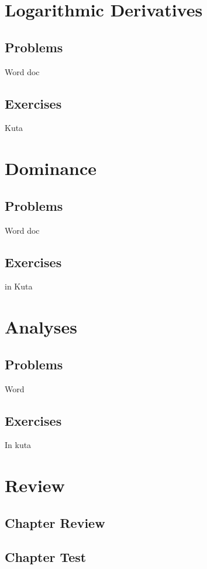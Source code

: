 \newpage
\section{Logarithmic Derivatives}
\subsection{Problems}
Word doc
\newpage

\newpage
\subsection{Exercises}
Kuta


\newpage
\section{Dominance}
\subsection{Problems}
Word doc
\newpage

\newpage
\subsection{Exercises}
in Kuta


\newpage
\section{Analyses}
\subsection{Problems}
Word
\newpage

\newpage
\subsection{Exercises}
In kuta




\newpage
\section{Review}
\subsection{Chapter Review}
\subsection{Chapter Test}
